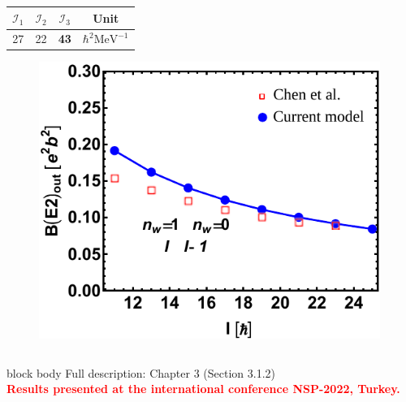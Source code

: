 \documentclass{beamer}
\begin{document}
\begin{frame}
\begin{columns}
\begin{column}{0.4\textwidth}
\begin{table}
{\begin{tabular}{cccc}
				\multicolumn{1}{c}{$\mathcal{I}_1$} & \multicolumn{1}{c}{$\mathcal{I}_2$} & \multicolumn{1}{c}{$\mathcal{I}_3$} & \multicolumn{1}{c}{Unit}                     \\ \hline
				\multicolumn{1}{c}{27}              & \multicolumn{1}{c}{22}              & \multicolumn{1}{c}{\textbf{43}}              & \multicolumn{1}{c}{$\hbar^2\text{MeV}^{-1}$} \\ \hline
				\end{tabular}%
				}
				\label{table-params-ba130}
			\end{table}
			\begin{figure}
				\centering
				\includegraphics[width=0.99\textwidth]{figures/ba130-EM.pdf}
			\end{figure}
		\end{column}
	\end{columns}
	
			
	\begin{beamercolorbox}[rounded=true,shadow=false, wd=\linewidth,]{block body}
		\centering
		Full description: Chapter 3 (Section 3.1.2)\\
		\textcolor{red}{\textbf{Results presented at the international conference NSP-2022, Turkey.}}
	\end{beamercolorbox}
\end{frame}
\end{document}
